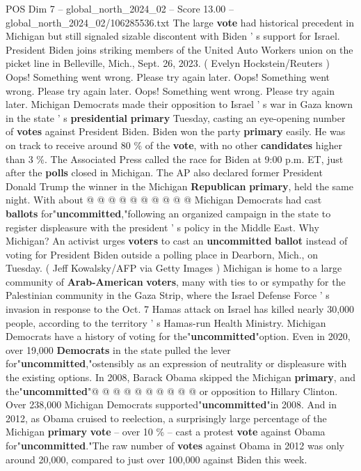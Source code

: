 \begin{textsample}{POS Dim 7 – global\_north\_2024\_02 – Score 13.00 – global\_north\_2024\_02/106285536.txt}  \label{ex:f7_pos_028}
The large \textbf{vote} had historical precedent in Michigan but still signaled sizable discontent with Biden ' s support for Israel.
President Biden joins striking members of the United Auto Workers union on the picket line in Belleville, Mich., Sept. 26, 2023. ( Evelyn Hockstein/Reuters ) Oops!
Something went wrong.
Please try again later.
Oops!
Something went wrong.
Please try again later.
Oops!
Something went wrong.
Please try again later.
Michigan Democrats made their opposition to Israel ' s war in Gaza known in the state ' s \textbf{presidential} \textbf{primary} Tuesday, casting an eye-opening number of \textbf{votes} against President Biden.
Biden won the party \textbf{primary} easily.
He was on track to receive around 80 \% of the \textbf{vote}, with no other \textbf{candidates} higher than 3 \%.
The Associated Press called the race for Biden at 9:00 p.m.
ET, just after the \textbf{polls} closed in Michigan.
The AP also declared former President Donald Trump the winner in the Michigan \textbf{Republican} \textbf{primary}, held the same night.
With about @ @ @ @ @ @ @ @ @ @ Michigan Democrats had cast \textbf{ballots} for"\textbf{uncommitted},"following an organized campaign in the state to register displeasure with the president ' s policy in the Middle East.
Why Michigan?
An activist urges \textbf{voters} to cast an \textbf{uncommitted} \textbf{ballot} instead of voting for President Biden outside a polling place in Dearborn, Mich., on Tuesday. ( Jeff Kowalsky/AFP via Getty Images ) Michigan is home to a large community of \textbf{Arab-American} \textbf{voters}, many with ties to or sympathy for the Palestinian community in the Gaza Strip, where the Israel Defense Force ' s invasion in response to the Oct. 7 Hamas attack on Israel has killed nearly 30,000 people, according to the territory ' s Hamas-run Health Ministry.
Michigan Democrats have a history of voting for the"\textbf{uncommitted}"option.
Even in 2020, over 19,000 \textbf{Democrats} in the state pulled the lever for"\textbf{uncommitted},"ostensibly as an expression of neutrality or displeasure with the existing options.
In 2008, Barack Obama skipped the Michigan \textbf{primary}, and the"\textbf{uncommitted}"@ @ @ @ @ @ @ @ @ @ or opposition to Hillary Clinton.
Over 238,000 Michigan Democrats supported"\textbf{uncommitted}"in 2008.
And in 2012, as Obama cruised to reelection, a surprisingly large percentage of the Michigan \textbf{primary} \textbf{vote} -- over 10 \% -- cast a protest \textbf{vote} against Obama for"\textbf{uncommitted}."The raw number of \textbf{votes} against Obama in 2012 was only around 20,000, compared to just over 100,000 against Biden this week.

\end{textsample}
